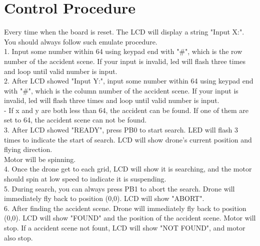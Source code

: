 \documentclass[a4paper, 12 pt]{report}
\begin{document}
\section{Control Procedure}
Every time when the board is reset. The LCD will display a string "Input X:".\\
You should always follow such emulate procedure.\\
1. Input some number within 64 using keypad end with "\#", which is the row number of the accident scene. If your input is invalid, led will flash three times and loop until valid number is input.\\
2. After LCD showed "Input Y:", input some number within 64 using keypad end with "\#", which is the column number of the accident scene. If your input is invalid, led will flash three times and loop until valid number is input.\\
- If x and y are both less than 64, the accident can be found. If one of them are set to 64, the accident scene can not be found.\\
3. After LCD showed "READY", press PB0 to start search. LED will flash 3 times to indicate the start of search. LCD will show drone's current position and flying direction.\\
Motor will be spinning.\\
4. Once the drone get to each grid, LCD will show it is searching, and the motor should spin at low speed to indicate it is suspending.\\
5. During search, you can always press PB1 to abort the search. Drone will immediately fly back to position (0,0). LCD will show "ABORT".\\
6. After finding the accident scene. Drone will immediately fly back to position (0,0).
LCD will show "FOUND" and the position of the accident scene. Motor will stop. If a accident scene not fount, LCD will show "NOT FOUND", and motor also stop.
\end{document}
